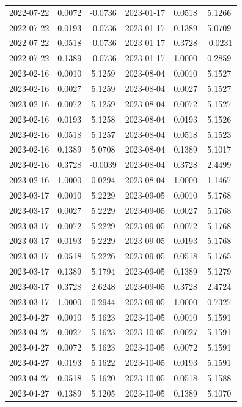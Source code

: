 \begin{footnotesize}
\begin{longtable}{lcc|lcc}
2022-07-22 & 0.0072 & -0.0736 & 2023-01-17 & 0.0518 & 5.1266 \\
2022-07-22 & 0.0193 & -0.0736 & 2023-01-17 & 0.1389 & 5.0709 \\
2022-07-22 & 0.0518 & -0.0736 & 2023-01-17 & 0.3728 & -0.0231 \\
2022-07-22 & 0.1389 & -0.0736 & 2023-01-17 & 1.0000 & 0.2859 \\
2023-02-16 & 0.0010 & 5.1259 & 2023-08-04 & 0.0010 & 5.1527 \\
2023-02-16 & 0.0027 & 5.1259 & 2023-08-04 & 0.0027 & 5.1527 \\
2023-02-16 & 0.0072 & 5.1259 & 2023-08-04 & 0.0072 & 5.1527 \\
2023-02-16 & 0.0193 & 5.1258 & 2023-08-04 & 0.0193 & 5.1526 \\
2023-02-16 & 0.0518 & 5.1257 & 2023-08-04 & 0.0518 & 5.1523 \\
2023-02-16 & 0.1389 & 5.0708 & 2023-08-04 & 0.1389 & 5.1017 \\
2023-02-16 & 0.3728 & -0.0039 & 2023-08-04 & 0.3728 & 2.4499 \\
2023-02-16 & 1.0000 & 0.0294 & 2023-08-04 & 1.0000 & 1.1467 \\
2023-03-17 & 0.0010 & 5.2229 & 2023-09-05 & 0.0010 & 5.1768 \\
2023-03-17 & 0.0027 & 5.2229 & 2023-09-05 & 0.0027 & 5.1768 \\
2023-03-17 & 0.0072 & 5.2229 & 2023-09-05 & 0.0072 & 5.1768 \\
2023-03-17 & 0.0193 & 5.2229 & 2023-09-05 & 0.0193 & 5.1768 \\
2023-03-17 & 0.0518 & 5.2226 & 2023-09-05 & 0.0518 & 5.1765 \\
2023-03-17 & 0.1389 & 5.1794 & 2023-09-05 & 0.1389 & 5.1279 \\
2023-03-17 & 0.3728 & 2.6248 & 2023-09-05 & 0.3728 & 2.4724 \\
2023-03-17 & 1.0000 & 0.2944 & 2023-09-05 & 1.0000 & 0.7327 \\
2023-04-27 & 0.0010 & 5.1623 & 2023-10-05 & 0.0010 & 5.1591 \\
2023-04-27 & 0.0027 & 5.1623 & 2023-10-05 & 0.0027 & 5.1591 \\
2023-04-27 & 0.0072 & 5.1623 & 2023-10-05 & 0.0072 & 5.1591 \\
2023-04-27 & 0.0193 & 5.1622 & 2023-10-05 & 0.0193 & 5.1591 \\
2023-04-27 & 0.0518 & 5.1620 & 2023-10-05 & 0.0518 & 5.1588 \\
2023-04-27 & 0.1389 & 5.1205 & 2023-10-05 & 0.1389 & 5.1070 \\

\end{longtable}
\end{footnotesize}

